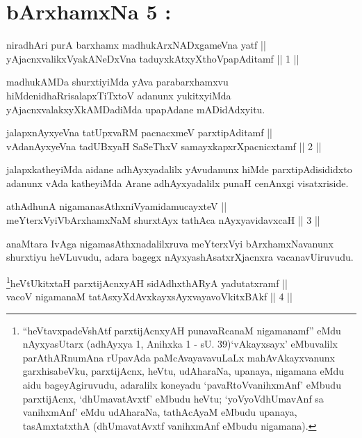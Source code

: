 
\chapter{bArxhamxNa 5 :}


\begin{shl}
niradhAri purA barxhamx madhukArxNADxgameVna yatf || \\
yAjacnxvalikxVyakANeDxVna taduyxkAtxyX\s thoVpapAditamf \hfill || 1 ||  
\end{shl}

\begin{artha}
madhukAMDa shurxtiyiMda yAva parabarxhamxvu hiMde\break nidhaRrisalapxTiTxtoV adanunx yukitxyiMda yAjacnxvalakxyXkAMDadiMda upapAdane mADidAdxyitu.
\end{artha}

\begin{shl}
jalapxnAyxyeVna tatUpxvaRM pacnacxmeV parxtipAditamf || \\
vAdanAyxyeVna tadUBxyaH SaSeThxV samayxkapxrXpacnicxtamf \hfill || 2 ||  
\end{shl}

\begin{artha}
jalapxkatheyiMda aidane adhAyxyadalilx yAvudanunx hiMde parxtipAdisididxto adanunx vAda katheyiMda Arane adhAyxyadalilx punaH cenAnxgi visatxriside.
\end{artha}

\begin{shl}
athAdhunA nigamanasAthxniVyamidamucayxteV || \\
meYterxVyiVbArxhamxNaM shurxtAyx tathAca nAyxyavidavxcaH \hfill || 3 ||  
\end{shl}

\begin{artha}
anaMtara IvAga nigamasAthxnadalilxruva meYterxVyi bArxhamxNavanunx shurxtiyu heVLuvudu, adara bagegx nAyxyashAsatxrXjacnxra vacanavU\break iruvudu.
\end{artha}



\begin{shl}
\footnote{``heVtavxpadeVshAtf parxtijAcnxyAH punavaRcanaM nigamanamf'' eMdu nAyxyasUtarx (adhAyxya 1, Anihxka 1 - sU. 39)`vAkayxsayx' eMbuvalilx parAthARnumAna rUpavAda paMcAvayavavuLaLx mahAvAkayxvanunx garxhisabeVku, parxtijAcnx, heVtu, udAharaNa, upanaya, nigamana eMdu aidu bageyAgiruvudu, adaralilx koneyadu `pavaRtoVvanihxmAnf' eMbudu parxtijAcnx, `dhUmavatAvxtf' eMbudu heVtu; `yoVyoVdhUmavAnf sa vanihxmAnf' eMdu udAharaNa, tathAcAyaM eMbudu upanaya, tasAmxtatxthA (dhUmavatAvxtf vanihxmAnf eMbudu nigamana).}heVtUkitxtaH parxtijAcnxyAH sidAdhxthARyA yadutatxramf || \\
vacoV nigamanaM tatAsxyXdAvxkayxsAyxvayavoVkitxBAkf \hfill || 4 ||  
\end{shl}

